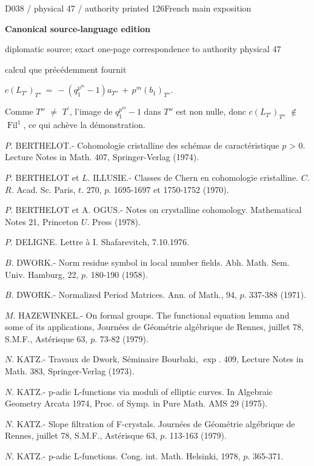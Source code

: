 \documentclass[9pt]{article}
\newcommand{\CanonHeading}[1]{\par\vspace{1.5pt}{\fontsize{8.6}{10.0}\selectfont\sffamily\bfseries\color{Accent} #1\par}\vspace{1.5pt}}
\newcommand{\CanonText}[1]{\par{\fontsize{8.0}{9.35}\selectfont\RaggedRight #1\par}\vspace{2.2pt}}
\newcommand{\CanonDisplay}[1]{\par\vspace{1.2pt}\begin{center}{\fontsize{7.2}{8.4}\selectfont\(\displaystyle #1\)}\end{center}\vspace{1.2pt}}
\newcommand{\LayerTitle}{Canonical source-language edition}
\begin{document}
\noindent\begin{minipage}[t][\dimexpr\textheight-5pt\relax][t]{\textwidth}
{\sffamily\fontsize{7.3}{8.2}\selectfont\color{Quiet} D038 / physical 47 / authority printed 126\hfill French main exposition}
\par{}\vspace{4.5pt}
{\sffamily\fontsize{10.4}{11.6}\selectfont\bfseries\color{Accent} \LayerTitle}
\par{\sffamily\fontsize{6.7}{7.7}\selectfont\color{Quiet} diplomatic source; exact one-page correspondence to authority physical 47}
\vspace{5pt}
\CanonText{calcul que précédemment fournit}
\CanonDisplay{c(L_{T'})_{T''}\,=\,-(q_{1}^{p^{m}}-1)a_{T''}\,+\,p^{m}(b_{1})_{T''}.}
\CanonText{Comme \(T''\) \(\neq{}\) \(T^{\prime}\), l'image de \(q_{1}^{p^{m}}-1\) dans \(T''\) est non nulle, donc \(c(L_{T'})_{T''}\) \(\notin{}\) \(\operatorname{Fil}^{1}\), ce qui achève la démonstration.}
\CanonHeading{BIBLIOGRAPHIE}
\CanonText{[1] \(P\). BERTHELOT.- Cohomologie cristalline des schémas de caractéristique \(p\) > 0. Lecture Notes in Math. 407, Springer-Verlag (1974).}
\CanonText{[2] \(P\). BERTHELOT et \(L\). ILLUSIE.- Classes de Chern en cohomologie cristalline. \(C\). \(R\). Acad. Sc. Paris, \(t\). 270, \(p\). 1695-1697 et 1750-1752 (1970).}
\CanonText{[3] \(P\). BERTHELOT et A. OGUS.- Notes on crystalline cohomology. Mathematical Notes 21, Princeton \(U\). Press (1978).}
\CanonText{[4] \(P\). DELIGNE. Lettre à I. Shafarevitch, 7.10.1976.}
\CanonText{[5] \(B\). DWORK.- Norm residue symbol in local number fields. Abh. Math. Sem. Univ. Hamburg, 22, \(p\). 180-190 (1958).}
\CanonText{[6] \(B\). DWORK.- Normalized Period Matrices. Ann. of Math., 94, \(p\). 337-388 (1971).}
\CanonText{[7] \(M\). HAZEWINKEL.- On formal groups. The functional equation lemma and some of its applications, Journées de Géométrie algébrique de Rennes, juillet 78, S.M.F., Astérisque 63, \(p\). 73-82 (1979).}
\CanonText{[8] \(N\). KATZ.- Travaux de Dwork, Séminaire Bourbaki, \(\operatorname{exp}\). 409, Lecture Notes in Math. 383, Springer-Verlag (1973).}
\CanonText{[9] \(N\). KATZ.- p-adic L-functions via moduli of elliptic curves. In Algebraic Geometry Arcata 1974, Proc. of Symp. in Pure Math. AMS 29 (1975).}
\CanonText{[10] \(N\). KATZ.- Slope filtration of F-crystals. Journées de Géométrie algébrique de Rennes, juillet 78, S.M.F., Astérisque 63, \(p\). 113-163 (1979).}
\CanonText{[11] \(N\). KATZ.- p-adic L-functions. Cong. int. Math. Helsinki, 1978, \(p\). 365-371.}

\end{minipage}
\end{document}
